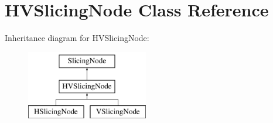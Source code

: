 \hypertarget{class_open_chams_1_1_h_v_slicing_node}{\section{H\-V\-Slicing\-Node Class Reference}
\label{class_open_chams_1_1_h_v_slicing_node}
}
Inheritance diagram for H\-V\-Slicing\-Node\-:\begin{figure}[H]
\begin{center}
\leavevmode
\includegraphics[height=3.000000cm]{class_open_chams_1_1_h_v_slicing_node}
\end{center}
\end{figure}
